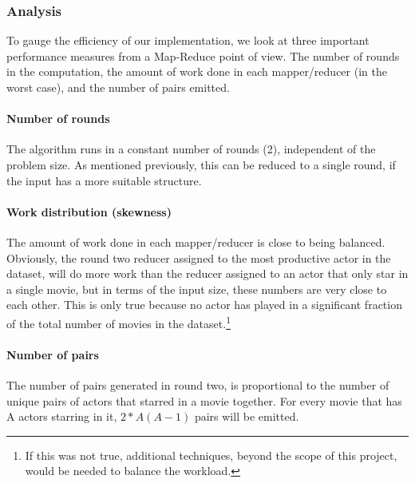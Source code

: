 \documentclass[a4paper,11pt]{article}
\begin{document}
\subsubsection{Analysis}
To gauge the efficiency of our implementation, we look at three important performance measures from a Map-Reduce point of view. The number of rounds in the computation, the amount of work done in each mapper/reducer (in the worst case), and the number of pairs emitted.

\paragraph{Number of rounds}
The algorithm runs in a constant number of rounds (2), independent of the problem size. As mentioned previously, this can be reduced to a single round, if the input has a more suitable structure.

\paragraph{Work distribution (skewness)}
The amount of work done in each mapper/reducer is close to being balanced. Obviously, the round two reducer assigned to the most productive actor in the dataset, will do more work than the reducer assigned to an actor that only star in a single movie, but in terms of the input size, these numbers are very close to each other. This is only true because no actor has played in a significant fraction of the total number of movies in the dataset.\footnote{If this was not true, additional techniques, beyond the scope of this project, would be needed to balance the workload.}

\paragraph{Number of pairs}
The number of pairs generated in round two, is proportional to the number of unique pairs of actors that starred in a movie together. For every movie that has A actors starring in it, $2*A(A-1)$ pairs will be emitted. %
\end{document}
